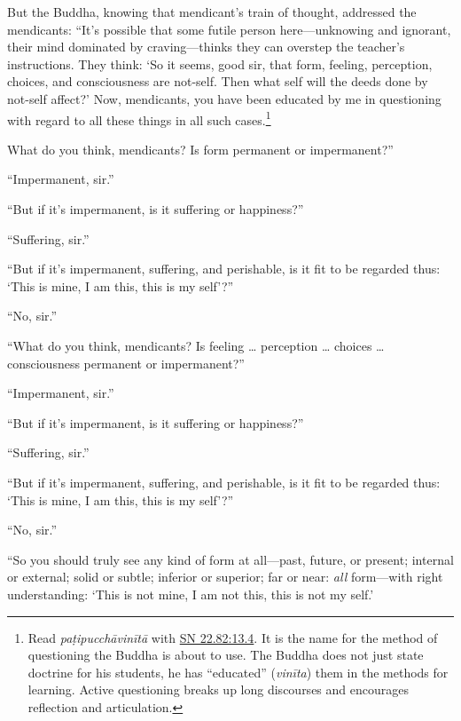 \documentclass[12pt,openany]{book}%
\begin{document}
But the Buddha, knowing that mendicant’s train of thought, addressed the mendicants: “It’s possible that some futile person here—unknowing and ignorant, their mind dominated by craving—thinks they can overstep the teacher’s instructions. They think: ‘So it seems, good sir, that form, feeling, perception, choices, and consciousness are not-self. Then what self will the deeds done by not-self affect?’ Now, mendicants, you have been educated by me in questioning with regard to all these things in all such cases.\footnote{Read \textit{\textsanskrit{paṭipucchāvinītā}} with \href{https://suttacentral.net/sn22.82/en/sujato\#13.4}{SN 22.82:13.4}. It is the name for the method of questioning the Buddha is about to use. The Buddha does not just state doctrine for his students, he has “educated” (\textit{\textsanskrit{vinīta}}) them in the methods for learning. Active questioning breaks up long discourses and encourages reflection and articulation. } 

What do you think, mendicants? Is form permanent or impermanent?” 

“Impermanent, sir.” 

“But if it’s impermanent, is it suffering or happiness?” 

“Suffering, sir.” 

“But if it’s impermanent, suffering, and perishable, is it fit to be regarded thus: ‘This is mine, I am this, this is my self’?” 

“No, sir.” 

“What do you think, mendicants? Is feeling … perception … choices … consciousness permanent or impermanent?” 

“Impermanent, sir.” 

“But if it’s impermanent, is it suffering or happiness?” 

“Suffering, sir.” 

“But if it’s impermanent, suffering, and perishable, is it fit to be regarded thus: ‘This is mine, I am this, this is my self’?” 

“No, sir.” 

“So you should truly see any kind of form at all—past, future, or present; internal or external; solid or subtle; inferior or superior; far or near: \emph{all} form—with right understanding: ‘This is not mine, I am not this, this is not my self.’ 
\end{document}
